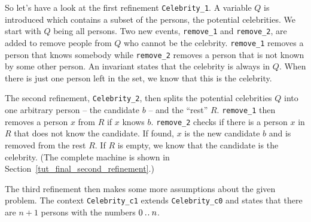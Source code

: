 
So let's have a look at the first refinement \texttt{Celebrity\_1}. 
A variable $Q$ is introduced which contains a subset of the persons, the potential celebrities.
We start with $Q$ being all persons.
Two new events,  \texttt{remove\_1} and \texttt{remove\_2}, are added to remove people
  from $Q$ who cannot be the celebrity.
\texttt{remove\_1} removes a person that knows somebody while \texttt{remove\_2}
  removes a person that is not known by some other person.
An invariant states that the celebrity is always in $Q$.
When there is just one person left in the set, we know that this is the celebrity.

The second refinement, \texttt{Celebrity\_2}, then splits the
  potential celebrities $Q$ into one arbitrary person -- the candidate $b$ --
  and the ``rest'' $R$.
\texttt{remove\_1} then removes a person $x$ from $R$ if $x$ knows $b$.
\texttt{remove\_2} checks if there is a person $x$ in $R$ that does not know the candidate.
If found, $x$ is the new candidate $b$ and is removed from the rest $R$.
If $R$ is empty, we know that the candidate is the celebrity. (The complete machine is shown in Section~\ref{tut_final_second_refinement}.)

The third refinement then makes some more assumptions about the given problem.
The context \texttt{Celebrity\_c1} extends \texttt{Celebrity\_c0} and states that
  there are $n+1$ persons with the numbers $0\mathbin{.\mkern1mu.} n$.

